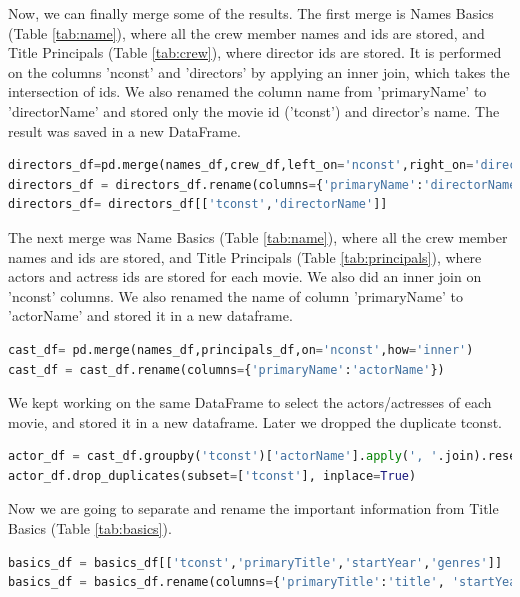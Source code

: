 Now, we can finally merge some of the results. The first merge is Names Basics (Table \ref{tab:name}),  where all the crew member names and ids are stored,  and Title Principals (Table \ref{tab:crew}), where director ids are stored. It is performed on the columns 'nconst' and 'directors' by applying an inner join, which takes the intersection of ids. We also renamed the column name from 'primaryName' to 'directorName' and stored only the movie id ('tconst') and director's name. The result was saved in a new DataFrame.

\begin{lstlisting}[language=python]
directors_df=pd.merge(names_df,crew_df,left_on='nconst',right_on='directors',how='inner')
directors_df = directors_df.rename(columns={'primaryName':'directorName'})
directors_df= directors_df[['tconst','directorName']]
\end{lstlisting}

The next merge was Name Basics (Table \ref{tab:name}), where all the crew member names and ids are stored, and Title Principals (Table \ref{tab:principals}), where actors and actress ids are stored for each movie. We also did an inner join on 'nconst' columns. We also renamed the name of column 'primaryName' to 'actorName' and stored it in a new dataframe.

\begin{lstlisting}[language=python]
cast_df= pd.merge(names_df,principals_df,on='nconst',how='inner')
cast_df = cast_df.rename(columns={'primaryName':'actorName'})
\end{lstlisting}

We kept working on the same DataFrame to select the actors/actresses of each movie, and stored it in a new dataframe. Later we dropped the duplicate tconst.

\begin{lstlisting}[language=python]
actor_df = cast_df.groupby('tconst')['actorName'].apply(', '.join).reset_index()
actor_df.drop_duplicates(subset=['tconst'], inplace=True)
\end{lstlisting}

Now we are going to separate and rename the important information from Title Basics (Table \ref{tab:basics}). 

\begin{lstlisting}[language=python]
basics_df = basics_df[['tconst','primaryTitle','startYear','genres']]
basics_df = basics_df.rename(columns={'primaryTitle':'title', 'startYear':'year'})
\end{lstlisting}

